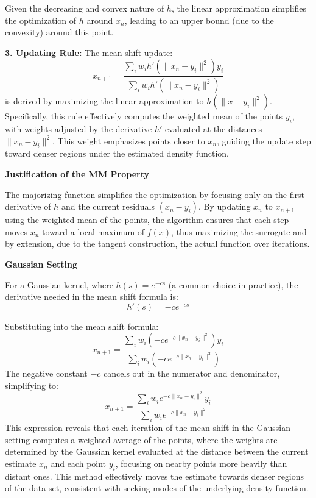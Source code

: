 \documentclass[8pt]{article}
\begin{document}
{   Given the decreasing and convex nature of \(h\), the linear approximation simplifies the optimization of \(h\) around \(x_n\), leading to an upper bound (due to the convexity) around this point.

\textbf{3. Updating Rule:}
   The mean shift update:
   \[
   x_{n+1} = \frac{\sum_i w_i h'(\|x_n - y_i\|^2) y_i}{\sum_i w_i h'(\|x_n - y_i\|^2)}
   \]
   is derived by maximizing the linear approximation to \(h(\|x - y_i\|^2)\). Specifically, this rule effectively computes the weighted mean of the points \(y_i\), with weights adjusted by the derivative \(h'\) evaluated at the distances \(\|x_n - y_i\|^2\). This weight emphasizes points closer to \(x_n\), guiding the update step toward denser regions under the estimated density function.

\textbf{Justification of the MM Property}

The majorizing function simplifies the optimization by focusing only on the first derivative of \(h\) and the current residuals \((x_n - y_i)\). By updating \(x_n\) to \(x_{n+1}\) using the weighted mean of the points, the algorithm ensures that each step moves \(x_n\) toward a local maximum of \(f(x)\), thus maximizing the surrogate and by extension, due to the tangent construction, the actual function over iterations.

\textbf{Gaussian Setting}

For a Gaussian kernel, where \( h(s) = e^{-cs} \) (a common choice in practice), the derivative needed in the mean shift formula is:
\[
h'(s) = -c e^{-cs}
\]

Substituting into the mean shift formula:
\[
x_{n+1} = \frac{\sum_i w_i (-c e^{-c\|x_n - y_i\|^2}) y_i}{\sum_i w_i (-c e^{-c\|x_n - y_i\|^2})}
\]
The negative constant \( -c \) cancels out in the numerator and denominator, simplifying to:
\[
x_{n+1} = \frac{\sum_i w_i e^{-c\|x_n - y_i\|^2} y_i}{\sum_i w_i e^{-c\|x_n - y_i\|^2}}
\]
This expression reveals that each iteration of the mean shift in the Gaussian setting computes a weighted average of the points, where the weights are determined by the Gaussian kernel evaluated at the distance between the current estimate \(x_n\) and each point \(y_i\), focusing on nearby points more heavily than distant ones. This method effectively moves the estimate towards denser regions of the data set, consistent with seeking modes of the underlying density function.

}
\end{document}
